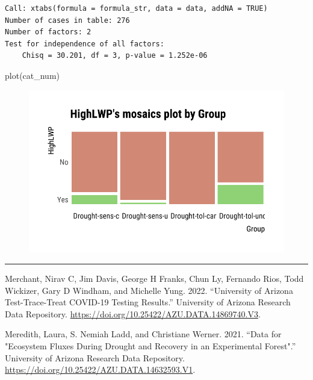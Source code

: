 \documentclass[
  letterpaper,
  DIV=11,
  numbers=noendperiod]{scrreprt}
\newenvironment{Shaded}{\begin{snugshade}}{\end{snugshade}}
\newcommand{\FunctionTok}[1]{\textcolor[rgb]{0.28,0.35,0.67}{#1}}
\newcommand{\NormalTok}[1]{\textcolor[rgb]{0.00,0.23,0.31}{#1}}
\newlength{\cslhangindent}
\newlength{\cslentryspacingunit} %
\newenvironment{CSLReferences}[2] %
 {%
  \setlength{\parindent}{0pt}
  \ifodd #1
  \let\oldpar\par
  \def\par{\hangindent=\cslhangindent\oldpar}
  \fi
  \setlength{\parskip}{#2\cslentryspacingunit}
 }%
 {}
\begin{document}
\begin{verbatim}
Call: xtabs(formula = formula_str, data = data, addNA = TRUE)
Number of cases in table: 276 
Number of factors: 2 
Test for independence of all factors:
    Chisq = 30.201, df = 3, p-value = 1.252e-06
\end{verbatim}

\begin{Shaded}
\begin{Highlighting}[]
\FunctionTok{plot}\NormalTok{(cat\_num)}
\end{Highlighting}
\end{Shaded}

\begin{figure}[H]

{\centering \includegraphics{./CorrelateLikeDataMaster_files/figure-pdf/unnamed-chunk-15-1.pdf}

}

\end{figure}

\begin{center}\rule{0.5\linewidth}{0.5pt}\end{center}

\hypertarget{refs}{}
\begin{CSLReferences}{1}{0}
\leavevmode{}%
Merchant, Nirav C, Jim Davis, George H Franks, Chun Ly, Fernando Rios,
Todd Wickizer, Gary D Windham, and Michelle Yung. 2022. {``University of
Arizona Test-Trace-Treat COVID-19 Testing Results.''} University of
Arizona Research Data Repository.
\url{https://doi.org/10.25422/AZU.DATA.14869740.V3}.

\leavevmode{}%
Meredith, Laura, S. Nemiah Ladd, and Christiane Werner. 2021. {``Data
for {"}Ecosystem Fluxes During Drought and Recovery in an Experimental
Forest{"}.''} University of Arizona Research Data Repository.
\url{https://doi.org/10.25422/AZU.DATA.14632593.V1}.

\end{CSLReferences}
\end{document}
